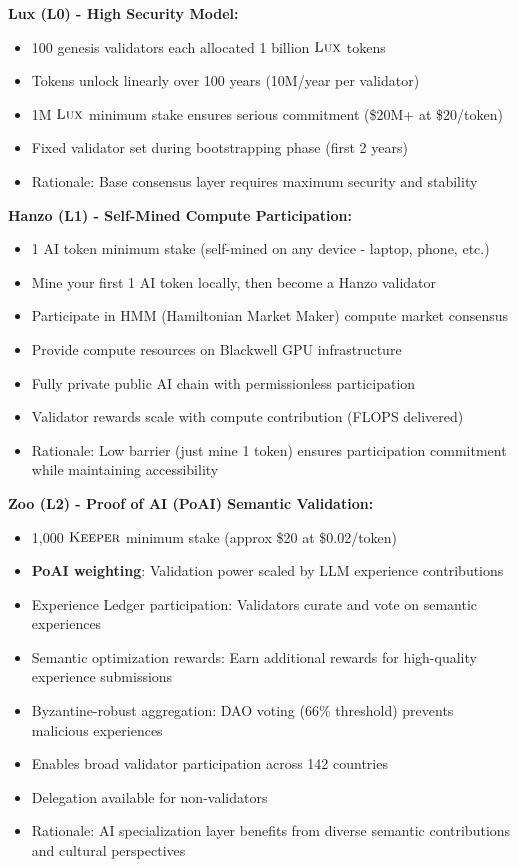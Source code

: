 \documentclass[11pt,letterpaper]{article}
\theoremstyle{definition}
\theoremstyle{remark}
\newcommand{\KEEPER}{\textsc{Keeper}}
\newcommand{\Lux}{\textsc{Lux}}
\begin{document}
\textbf{Lux (L0) - High Security Model:}
\begin{itemize}
\item 100 genesis validators each allocated 1 billion $\Lux$ tokens
\item Tokens unlock linearly over 100 years (10M/year per validator)
\item 1M $\Lux$ minimum stake ensures serious commitment (\$20M+ at \$20/token)
\item Fixed validator set during bootstrapping phase (first 2 years)
\item Rationale: Base consensus layer requires maximum security and stability
\end{itemize}

\textbf{Hanzo (L1) - Self-Mined Compute Participation:}
\begin{itemize}
\item 1 AI token minimum stake (self-mined on any device - laptop, phone, etc.)
\item Mine your first 1 AI token locally, then become a Hanzo validator
\item Participate in HMM (Hamiltonian Market Maker) compute market consensus
\item Provide compute resources on Blackwell GPU infrastructure
\item Fully private public AI chain with permissionless participation
\item Validator rewards scale with compute contribution (FLOPS delivered)
\item Rationale: Low barrier (just mine 1 token) ensures participation commitment while maintaining accessibility
\end{itemize}

\textbf{Zoo (L2) - Proof of AI (PoAI) Semantic Validation:}
\begin{itemize}
\item 1,000 $\KEEPER$ minimum stake (approx \$20 at \$0.02/token)
\item \textbf{PoAI weighting}: Validation power scaled by LLM experience contributions
\item Experience Ledger participation: Validators curate and vote on semantic experiences
\item Semantic optimization rewards: Earn additional rewards for high-quality experience submissions
\item Byzantine-robust aggregation: DAO voting (66\% threshold) prevents malicious experiences
\item Enables broad validator participation across 142 countries
\item Delegation available for non-validators
\item Rationale: AI specialization layer benefits from diverse semantic contributions and cultural perspectives
\end{itemize}
\end{document}
